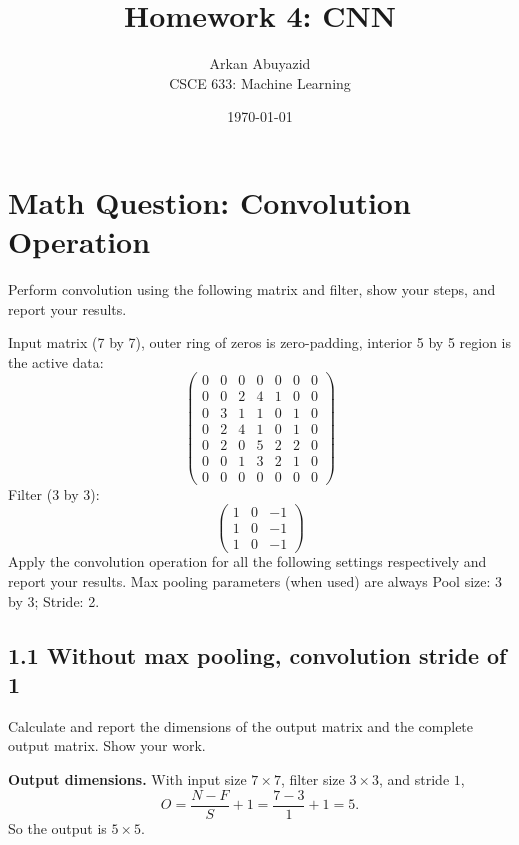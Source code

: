 \documentclass[10pt]{article}
\title{Homework 4: CNN}
\author{Arkan Abuyazid \\ CSCE 633: Machine Learning}
\date{\today}
\begin{document}
\maketitle

\section{Math Question: Convolution Operation}
\label{sec:math}

\begin{question}
Perform convolution using the following matrix and filter, show your steps, and report your
results.

Input matrix (7 by 7), outer ring of zeros is zero-padding, interior 5 by 5 region is the active
data:
\[
\begin{pmatrix}
0 & 0 & 0 & 0 & 0 & 0 & 0 \\
0 & 0 & 2 & 4 & 1 & 0 & 0 \\
0 & 3 & 1 & 1 & 0 & 1 & 0 \\
0 & 2 & 4 & 1 & 0 & 1 & 0 \\
0 & 2 & 0 & 5 & 2 & 2 & 0 \\
0 & 0 & 1 & 3 & 2 & 1 & 0 \\
0 & 0 & 0 & 0 & 0 & 0 & 0
\end{pmatrix}
\]
Filter (3 by 3):
\[
\begin{pmatrix}
1 & 0 & -1 \\
1 & 0 & -1 \\
1 & 0 & -1
\end{pmatrix}
\]
Apply the convolution operation for all the following settings respectively and report your
results. Max pooling parameters (when used) are always Pool size: 3 by 3; Stride: 2.
\end{question}

\subsection{1.1 Without max pooling, convolution stride of 1}
\label{sec:q1-1}
\begin{question}
Calculate and report the dimensions of the output matrix and the complete output matrix. Show
your work.
\end{question}

\textbf{Output dimensions.} With input size $7\times7$, filter size $3\times3$, and stride $1$,
\[
O = \frac{N-F}{S}+1 = \frac{7-3}{1}+1 = 5.
\]
So the output is $5\times5$.
\end{document}
